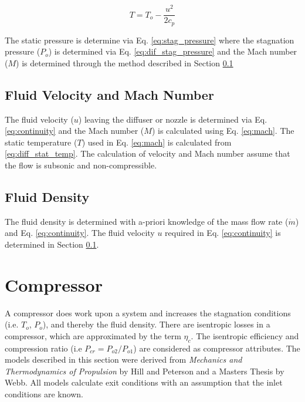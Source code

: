 \begin{equation}
\label{eq:diff_stat_temp}
T = T_o-\frac{u^2}{2c_p}
\end{equation}

\noindent The static pressure is determine via Eq. \ref{eq:stag_pressure} where the stagnation pressure ($P_o$) is
determined via Eq. \ref{eq:dif_stag_pressure} and the Mach number ($M$) is determined through the method 
described in Section \ref{dif:mach}

\subsection{Fluid Velocity and Mach Number} \label{dif:mach}
The fluid velocity ($u$) leaving the diffuser or nozzle is determined via Eq. \ref{eq:continuity} and the Mach number ($M$) is calculated
using Eq. \ref{eq:mach}.  The static temperature ($T$) used in Eq. \ref{eq:mach} is calculated from \ref{eq:diff_stat_temp}.  The calculation of velocity
and Mach number assume that the flow is subsonic and non-compressible.

\subsection{Fluid Density}
The fluid density is determined with a-priori knowledge of the mass flow rate ($\dot{m}$) and Eq. \ref{eq:continuity}.  The fluid velocity $u$ 
required in Eq. \ref{eq:continuity} is determined in Section \ref{dif:mach}.

\section{Compressor}
A compressor does work upon a system and increases the stagnation conditions (i.e. $T_o$, $P_o$), and thereby the fluid density.  There
are isentropic losses in a compressor, which are approximated by the term $\eta_c$. The isentropic efficiency and compression 
ratio (i.e $P_{cr}=P_{o2}/P_{o1}$) are considered as compressor attributes. The models described in this section were derived 
from \textit{Mechanics and Thermodynamics of Propulsion} by Hill and Peterson\cite{Hill} and a Masters Thesis by Webb\cite{Webb}.
All models calculate exit conditions with an assumption that the inlet conditions are known.

